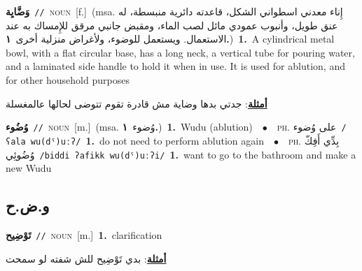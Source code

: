 \documentclass[10pt,a4paper,twoside]{article} %
\begin{document}
\begin{multicols}{2}
{\setlength\topsep{0pt}\textbf{\foreignlanguage{arabic}{وَضَّايِة}}\ {\color{gray}\texttt{//}\color{black}}\ \textsc{noun}\ [f.]\ \color{gray}(msa. \foreignlanguage{arabic}{إِناء معدني اسطواني الشكل، قاعدته دائرية منبسطة، له عنق طويل، وأنبوب عمودي مائل لصب الماء، ومقبض جانبي مرقق للإِمساك به عند الاستعمال. ويستعمل للوضوء، ولأغراض منزلية أخرى}~\foreignlanguage{arabic}{\textbf{١.}})\color{black}\ \textbf{1.}~A cylindrical metal bowl, with a flat circular base, has a long neck, a vertical tube for pouring water, and a laminated side handle to hold it when in use. It is used for ablution, and for other household purposes\  \begin{flushright}\color{gray}\foreignlanguage{arabic}{\textbf{\underline{\foreignlanguage{arabic}{أمثلة}}}: جدتي بدها وضاية مش قادرة تقوم تتوضى لحالها عالمغسلة}\end{flushright}\color{black}} \vspace{2mm}

{\setlength\topsep{0pt}\textbf{\foreignlanguage{arabic}{وُضُوء}}\ {\color{gray}\texttt{//}\color{black}}\ \textsc{noun}\ [m.]\ \color{gray}(msa. \foreignlanguage{arabic}{وُضوء}~\foreignlanguage{arabic}{\textbf{١.}})\color{black}\ \textbf{1.}~Wudu (ablution)\ \ $\bullet$\ \ \textsc{ph.} \color{gray} \foreignlanguage{arabic}{على وُضوء}\color{black}\ {\color{gray}\texttt{/{\sffamily ʕala wu(dˤ)uːʔ}/}\color{black}}\ \textbf{1.}~do not need to perform ablution  again\ \ $\bullet$\ \ \textsc{ph.} \color{gray} \foreignlanguage{arabic}{بِدِّي أَفِكّ وُضُوئِي}\color{black}\ {\color{gray}\texttt{/{\sffamily biddi ʔafikk wu(dˤ)uːʔi}/}\color{black}}\ \textbf{1.}~want to go to the bathroom and make a new Wudu\ } \vspace{2mm}

\vspace{-3mm}
\subsection*{\color{blue}\foreignlanguage{arabic}{و.ض.ح}\color{blue}{}} 

{\setlength\topsep{0pt}\textbf{\foreignlanguage{arabic}{تَوْضِيح}}\ {\color{gray}\texttt{//}\color{black}}\ \textsc{noun}\ [m.]\ \textbf{1.}~clarification\  \begin{flushright}\color{gray}\foreignlanguage{arabic}{\textbf{\underline{\foreignlanguage{arabic}{أمثلة}}}: بدي تَوْضِيح للش شفته لو سمحت}\end{flushright}\color{black}} \vspace{2mm}


\end{multicols}
\end{document}
